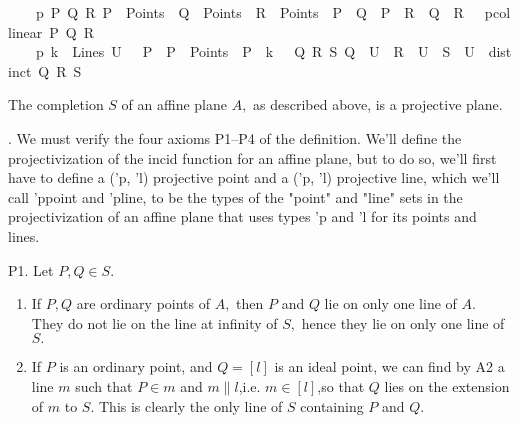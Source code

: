 \begin{isabellebody}
\ \ \ \ p{}{\isacharcolon}{\kern0pt}\ {\isachardoublequoteopen}{\isasymexists}P\ Q\ R{\isachardot}{\kern0pt}\ P\ {\isasymin}\ Points\ {\isasymand}\ Q\ {\isasymin}\ Points\ {\isasymand}\ R\ {\isasymin}\ Points\ {\isasymand}\ P\ {\isasymnoteq}\ Q\ {\isasymand}\ P\ {\isasymnoteq}\ R\ {\isasymand}\ Q\ {\isasymnoteq}\ R\ {\isasymand}\ {\isasymnot}\ {\isacharparenleft}{\kern0pt}pcollinear\ P\ Q\ R{\isacharparenright}{\kern0pt}{\isachardoublequoteclose}\ \isanewline
\ \ \ \ p{}{\isacharcolon}{\kern0pt}\ {\isachardoublequoteopen}{\isasymlbrakk}k\ {\isasymin}\ Lines{\isacharsemicolon}{\kern0pt}\ U\ {\isacharequal}{\kern0pt}\ {\isacharbraceleft}{\kern0pt}\ P\ {\isachardot}{\kern0pt}\ {\isacharparenleft}{\kern0pt}P\ {\isasymin}\ Points\ {\isasymand}\ P\ {\isasymlhd}\ k{\isacharparenright}{\kern0pt}{\isacharbraceright}{\kern0pt}\ {\isasymrbrakk}\ {\isasymLongrightarrow}\ {\isasymexists}Q\ R\ S{\isachardot}{\kern0pt}\ Q\ {\isasymin}\ U\ {\isasymand}\ R\ {\isasymin}\ U\ {\isasymand}\ S\ {\isasymin}\ U\ {\isasymand}\ distinct\ {\isacharbrackleft}{\kern0pt}Q{\isacharcomma}{\kern0pt}\ R{\isacharcomma}{\kern0pt}\ S{\isacharbrackright}{\kern0pt}{\isachardoublequoteclose}\isanewline
\isanewline
{}\isanewline
\isanewline
\isanewline
\isanewline
{}\isamarkupfalse%
%
\begin{isamarkuptext}%
\hartshorne
\prop[1.3] The completion $S$ of an affine plane $A,$ as described above, is a projective plane.

\proof. We must verify the four axioms P1–P4 of the definition. 
\done
\spike
We'll define the projectivization of the incid function for an affine plane, but to do so, we'll first
have to define a ('p, 'l) projective point and a ('p, 'l) projective line, which we'll call 'ppoint and 'pline,
to be the types of the "point" and "line" sets in the projectivization of an affine plane that uses 
types 'p and 'l for its points and lines. 
\done

       
P1. Let $P,Q  \in S$.
\begin{enumerate}
\item If $P,Q$  are ordinary points of $A,$ then $P$ and $Q$ lie on only one line of $A.$ They do not 
lie on the line at infinity of $S,$ hence they lie on only one line of $S.$

\item If $P$ is an ordinary point, and $Q = [l]$ is an ideal point, we can find by A2 a line $m$ 
such that $P \in m$ and $m \parallel l$,i.e. $m \in [l]$,so that $Q$  lies on the extension of $m$ 
to $S.$ This is clearly the only line of $S$ containing $P$ and $Q.$


\end{enumerate}
\end{isamarkuptext}
\end{isabellebody}
